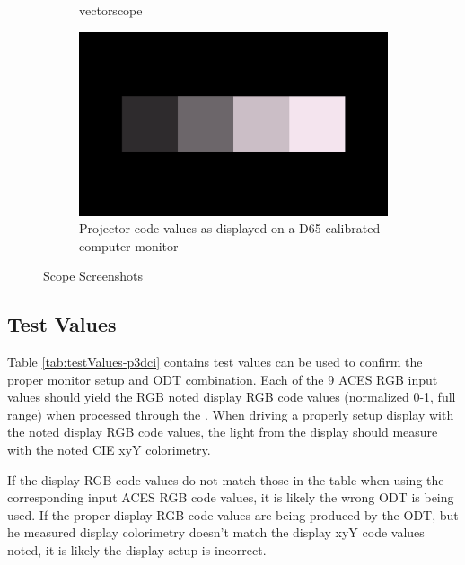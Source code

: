 \begin{figure}[ht!]
\begin{subfigure}[b]{0.475\textwidth}
            \caption[]%
            {{\small vectorscope}}    
            \label{fig:vect-p3dci}
        \end{subfigure}
        \quad
        \begin{subfigure}[b]{0.475\textwidth}   
            \centering 
            \includegraphics[width=\textwidth]{images/p3dci/p3dci_image}
            \caption[Projector code values as displayed on a D65 calibrated computer monitor]%
            {{\small Projector code values as displayed on a D65 calibrated computer monitor}}    
            \label{fig:cv-p3dci}
        \end{subfigure}
        \caption[]
        {\small \texttt{} Scope Screenshots} 
        \label{fig:screenshots-p3dci}
    \end{figure}

\subsection{Test Values}
\label{subsec:testValues-p3dci}

Table \ref{tab:testValues-p3dci} contains test values can be used to confirm the proper monitor setup and ODT combination.  Each of the 9 ACES RGB input values should yield the RGB noted display RGB code values (normalized 0-1, full range) when processed through the \texttt{}. When driving a properly setup display with the noted display RGB code values, the light from the display should measure with the noted CIE xyY colorimetry.  

If the display RGB code values do not match those in the table when using the corresponding input ACES RGB code values, it is likely the wrong ODT is being used.  If the proper display RGB code values are being produced by the ODT, but he measured display colorimetry doesn't match the display xyY code values noted, it is likely the display setup is incorrect.

